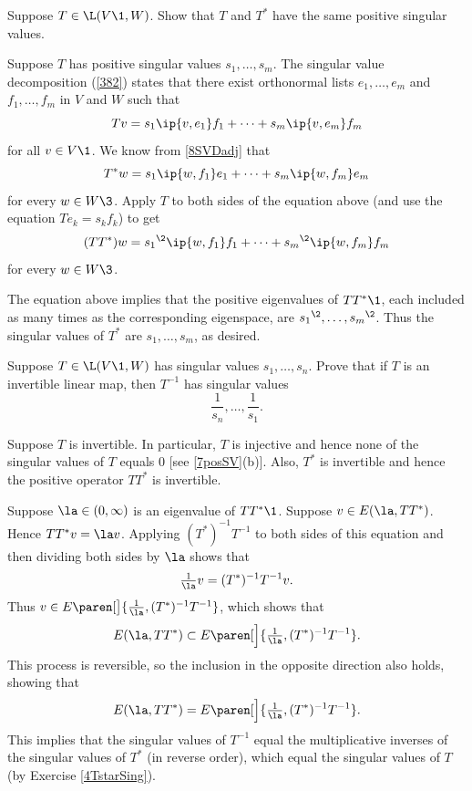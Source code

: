 \exercise
Suppose $T \in \L(V\1, W)$. Show that $T$ and $T^*$ have the same positive singular values. \label{4TstarSing}

\begin{Solution}
Suppose $T$ has positive singular values $s_1, \ldots, s_m$. The singular value decomposition (\ref{382}) states that there exist orthonormal lists $e_1, \ldots, e_m$ and $f_1, \ldots, f_m$ in $V$ and $W$ such that
\[
Tv = s_1 \ip{v, e_1} f_1 + \cdots + s_m \ip{v, e_m} f_m
\]
for all $v \in V\1$. We know from \ref{8SVDadj} that
\[
T^*w = s_1 \ip{w, f_1} e_1 + \dots + s_m \ip{w, f_m} e_m
\]
for every $w \in W\3$. Apply $T$ to both sides of the equation above (and use the equation $Te_k = s_k f_k$) to get
\[
(TT^*)w = {s_1}^{\2} \ip{w, f_1} f_1 + \dots + {s_m}^{\2} \ip{w, f_m} f_m
\]
for every $w \in W\3$.

The equation above implies that the positive eigenvalues of $TT^*\1$, each included as many times as the corresponding eigenspace, are ${s_1}^{\2}, \ldots, {s_m}^{\2}$. Thus the singular values of $T^*$ are $s_1, \ldots, s_m$, as desired.
\end{Solution}

\exercise
Suppose $T \in \L(V\1, W)$ has singular values $s_1, \ldots, s_n$. Prove that if $T$ is an  invertible linear map, then $T^{-1}$ has singular values\label{7singinv}
\[
\frac{1}{s_n}, \ldots, \frac{1}{s_1}.
\]
\exercisedisplayend

\begin{Solution}
Suppose $T$ is invertible. In particular, $T$ is injective and hence none of the singular values of $T$ equals $0$ [see \ref{7posSV}(b)]. Also, $T^*$ is invertible and hence the positive operator $TT^*$ is invertible.

Suppose $\la \in (0, \infty)$ is an eigenvalue of $TT^*\1$. Suppose $v \in E(\la, TT^*)$. Hence $TT^* v = \la v$. Applying $(T^*)^{-1}T^{-1}$ to both sides of this equation and then dividing both sides by $\la$ shows that
\[
\tfrac{1}{\la} v = (T^*)^{-1} T^{-1} v.
\]
Thus $v \in E\paren[\big]{ \frac{1}{\la}, (T^*)^{-1} T^{-1} }$, which shows that
\[
E(\la, TT^*) \subset E\paren[\Big]{ \tfrac{1}{\la}, (T^*)^{-1} T^{-1} }.
\]
This process is reversible, so the inclusion in the opposite direction also holds, showing that
\[
E(\la, TT^*) = E\paren[\Big]{ \tfrac{1}{\la}, (T^*)^{-1} T^{-1} }.
\]
This implies that the singular values of $T^{-1}$ equal the multiplicative inverses of the singular values of $T^*$ (in reverse order), which equal the singular values of $T$ (by Exercise \ref{4TstarSing}).
\end{Solution}

